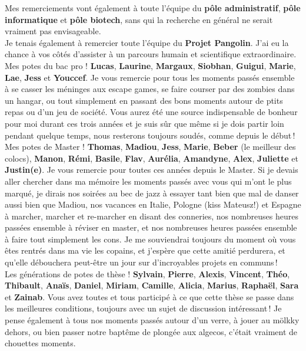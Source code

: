 Mes remerciements vont également à toute l'équipe du \textbf{pôle administratif}, \textbf{pôle informatique} et \textbf{pôle biotech}, sans qui la recherche en général ne serait vraiment pas envisageable.\\

Je tenais également à remercier toute l'équipe du \textbf{Projet Pangolin}. J'ai eu la chance à vos côtés d'assister à un parcours humain et scientifique extraordinaire.\\
\newpage
Mes potes du bac pro ! \textbf{Lucas}, \textbf{Laurine}, \textbf{Margaux}, \textbf{Siobhan}, \textbf{Guigui}, \textbf{Marie}, \textbf{Lae}, \textbf{Jess} et \textbf{Youccef}. Je vous remercie pour tous les moments passés ensemble à se casser les méninges aux escape games, se faire courser par des zombies dans un hangar, ou tout simplement en passant des bons moments autour de ptits repas ou d'un jeu de société. Vous aurez été une source indispensable de bonheur pour moi durant ces trois années et je suis sûr que même si je dois partir loin pendant quelque temps, nous resterons toujours soudés, comme depuis le début !\\

Mes potes de Master ! \textbf{Thomas}, \textbf{Madiou}, \textbf{Jess}, \textbf{Marie}, \textbf{Beber} (le meilleur des colocs), \textbf{Manon}, \textbf{Rémi}, \textbf{Basile}, \textbf{Flav}, \textbf{Aurélia}, \textbf{Amandyne}, \textbf{Alex}, \textbf{Juliette} et \textbf{Justin(e)}. Je vous remercie pour toutes ces années depuis le Master. Si je devais aller chercher dans ma mémoire les moments passés avec vous qui m’ont le plus marqué, je dirais nos soirées au bec de jazz à essayer tant bien que mal de danser aussi bien que Madiou, nos vacances en Italie, Pologne (kiss Mateusz!) et Espagne à marcher, marcher et re-marcher en disant des conneries, nos nombreuses heures passées ensemble à réviser en master, et nos nombreuses heures passées ensemble à faire tout simplement les cons. Je me souviendrai toujours du moment où vous êtes rentrés dans ma vie les copains, et j’espère que cette amitié perdurera, et qu'elle débouchera peut-être un jour sur d’incroyables projets en communs !\\

Les générations de potes de thèse ! \textbf{Sylvain}, \textbf{Pierre}, \textbf{Alexis}, \textbf{Vincent}, \textbf{Théo}, \textbf{Thibault}, \textbf{Anaïs}, \textbf{Daniel}, \textbf{Miriam}, \textbf{Camille}, \textbf{Alicia}, \textbf{Marius}, \textbf{Raphaël}, \textbf{Sara} et \textbf{Zainab}. Vous avez toutes et tous participé à ce que cette thèse se passe dans les meilleures conditions, toujours avec un sujet de discussion intéressant ! Je pense également à tous nos moments passés autour d’un verre, à jouer au mölkky dehors, ou bien passer notre baptême de plongée aux algecos, c’était vraiment de chouettes moments.\\

